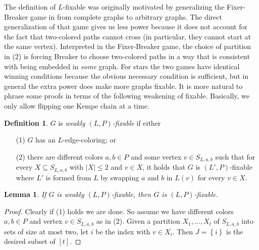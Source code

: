 \documentclass[12pt]{article}
\theoremstyle{plain}
\newtheorem{lem}[thm]{Lemma}
\theoremstyle{definition}
\newtheorem{defn}{Definition}
\theoremstyle{remark}
\newcommand{\set}[1]{\left\{ #1 \right\}}
\newcommand{\irange}[1]{\left[#1\right]}
\begin{document}
The definition of $L$-fixable was originally motivated by generalizing 
the Fixer-Breaker game in \cite{HallGame} from complete graphs to arbitrary graphs.  
The direct generalization of that game gives us less power because it does not
account for the fact that two-colored paths cannot cross (in particular, they cannot start at the same vertex).  Interpreted in the
Fixer-Breaker game, the choice of partition in (2) is forcing Breaker to choose
two-colored paths in a way that is consistent with being embedded in
\emph{some} graph.  For stars the two games have identical winning conditions
because the obvious necessary condition is sufficient, but in general the extra
power does make more graphs fixable.  It is more natural to phrase
some proofs in terms of the following weakening of fixable.  
Basically, we only allow flipping one Kempe chain at a time.

\begin{defn}
$G$ is \emph{weakly $(L, P)$-fixable} if either
\begin{enumerate}
\item[(1)] $G$ has an $L$-edge-coloring; or
\item[(2)] there are different colors $a,b \in P$ and some vertex $v \in S_{L,a,b}$ such
that for every $X \subseteq S_{L,a,b}$ with $|X| \le 2$ and $v \in X$, it holds
that $G$ is $(L', P)$-fixable where $L'$ is formed from $L$ by swapping $a$ and
$b$ in $L(v)$ for every $v \in X$.
\end{enumerate}
\end{defn}

\begin{lem}\label{weaklyfixable}
If $G$ is weakly $(L, P)$-fixable, then $G$ is $(L, P)$-fixable.
\end{lem}
\begin{proof}
Clearly if (1) holds we are done.  So assume we have different colors $a,b \in P$ and
vertex $v \in S_{L,a,b}$ as in (2). Given a partition $X_1, \ldots, X_t$ of
$S_{L,a,b}$ into sets of size at most two, let $i$ be the index with $v \in
X_i$.  Then $J = \set{i}$ is the desired subset of $\irange{t}$.
\end{proof}
\end{document}
